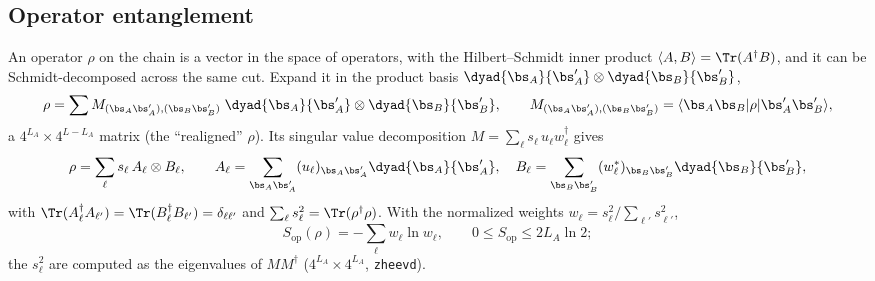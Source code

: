 \subsection{Operator entanglement}

An operator $\rho$ on the chain is a vector in the space of operators, with the Hilbert--Schmidt inner product $\langle A, B\rangle = \Tr(A^\dagger B)$, and it can be Schmidt-decomposed across the same cut. Expand it in the product basis $\dyad{\bs_A}{\bs_A'}\otimes\dyad{\bs_B}{\bs_B'}$,
\begin{equation}
\rho = \sum M_{(\bs_A\bs_A'),(\bs_B\bs_B')}\;\dyad{\bs_A}{\bs_A'}\otimes\dyad{\bs_B}{\bs_B'}, \qquad M_{(\bs_A\bs_A'),(\bs_B\bs_B')} = \langle\bs_A\bs_B\vert\rho\vert\bs_A'\bs_B'\rangle ,
\end{equation}
a $4^{L_A}\times4^{L-L_A}$ matrix (the ``realigned'' $\rho$). Its singular value decomposition $M = \sum_\ell s_\ell\,u_\ell w_\ell^\dagger$ gives
\begin{equation}
\rho = \sum_\ell s_\ell\,A_\ell\otimes B_\ell, \qquad A_\ell = \sum_{\bs_A\bs_A'}(u_\ell)_{\bs_A\bs_A'}\dyad{\bs_A}{\bs_A'},\quad B_\ell = \sum_{\bs_B\bs_B'}(w_\ell^*)_{\bs_B\bs_B'}\dyad{\bs_B}{\bs_B'},
\end{equation}
with $\Tr(A_\ell^\dagger A_{\ell'}) = \Tr(B_\ell^\dagger B_{\ell'}) = \delta_{\ell\ell'}$ and $\sum_\ell s_\ell^2 = \Tr(\rho^\dagger\rho)$. With the normalized weights $w_\ell = s_\ell^2/\sum_{\ell'}s_{\ell'}^2$,
\begin{equation}
S_{\mathrm{op}}(\rho) = -\sum_\ell w_\ell\ln w_\ell, \qquad 0 \le S_{\mathrm{op}} \le 2L_A\ln2 ;
\end{equation}
the $s_\ell^2$ are computed as the eigenvalues of $MM^\dagger$ ($4^{L_A}\times4^{L_A}$, \texttt{zheevd}).

